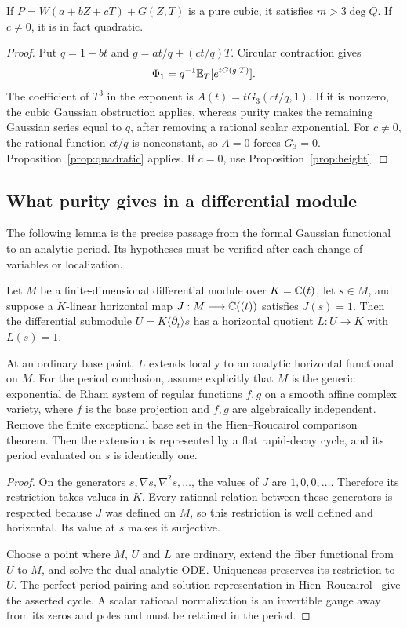 \begin{corollary}\label{cor:linearwt}
If $P=W(a+bZ+cT)+G(Z,T)$ is a pure cubic, it satisfies
$m>3\deg Q$. If $c\ne0$, it is in fact quadratic.
\end{corollary}
\begin{proof}
Put $q=1-bt$ and $g=at/q+(ct/q)T$. Circular contraction gives
\[
 \Phi_1=q^{-1}\mathbb E_T[e^{tG(g,T)}].
\]
The coefficient of $T^3$ in the exponent is
$A(t)=tG_3(ct/q,1)$. If it is nonzero, the cubic Gaussian
obstruction applies, whereas purity makes the remaining Gaussian
series equal to $q$, after removing a rational scalar exponential.
For $c\ne0$, the rational function $ct/q$ is nonconstant, so
$A=0$ forces $G_3=0$. Proposition~\ref{prop:quadratic} applies.
If $c=0$, use Proposition~\ref{prop:height}.
\end{proof}

\subsection{What purity gives in a differential module}\label{sec:seedbridge}

The following lemma is the precise passage from the formal Gaussian
functional to an analytic period. Its hypotheses must be verified
after each change of variables or localization.

\begin{lemma}\label{lem:seedfunctional}
Let $M$ be a finite-dimensional differential module over $K=\mathbb C(t)$,
let $s\in M$, and suppose a $K$-linear horizontal map
$J:M\longrightarrow\mathbb C((t))$ satisfies $J(s)=1$. Then the differential
submodule $U=K\langle\partial_t\rangle s$ has a horizontal quotient
$L:U\longrightarrow K$ with $L(s)=1$.

At an ordinary base point, $L$ extends locally to an analytic horizontal
functional on $M$. For the period conclusion, assume explicitly that
$M$ is the generic exponential de Rham system of regular functions
$f,g$ on a smooth affine complex variety, where $f$ is the base
projection and $f,g$ are algebraically independent. Remove the finite
exceptional base set in the Hien--Roucairol comparison theorem.
Then the extension is represented by a flat rapid-decay cycle, and its
period evaluated on $s$ is identically one.
\end{lemma}
\begin{proof}
On the generators $s,\nabla s,\nabla^2s,\ldots$, the values of $J$
are $1,0,0,\ldots$. Therefore its restriction takes values in $K$.
Every rational relation between these generators is respected because
$J$ was defined on $M$, so this restriction is well defined and
horizontal. Its value at $s$ makes it surjective.

Choose a point where $M$, $U$ and $L$ are ordinary, extend the fiber
functional from $U$ to $M$, and solve the dual analytic ODE.
Uniqueness preserves its restriction to $U$. The perfect period
pairing and solution representation in
Hien--Roucairol~\cite[Theorems~2.4 and~3.7]{HienRoucairol} give the
asserted cycle. A scalar rational normalization is an invertible gauge
away from its zeros and poles and must be retained in the period.
\end{proof}

